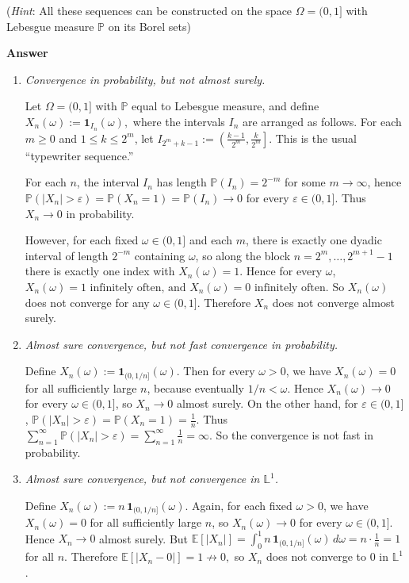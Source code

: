 \documentclass[letterpaper]{article}
\begin{document}
		(\emph{Hint}: All these sequences can be constructed on the space $\Omega=(0,1]$ with Lebesgue measure $\mathbb{P}$ on its Borel sets)
		
		
		\textbf{Answer} 
		
		\begin{enumerate}
			
			\item[(i)] \emph{Convergence in probability, but not almost surely.}
			
			Let $\Omega=(0,1]$ with $\mathbb{P}$ equal to Lebesgue measure, and define
			$
			X_n(\omega):=\mathbf{1}_{I_n}(\omega),
			$
			where the intervals $I_n$ are arranged as follows. For each $m\geq 0$ and $1\leq k\leq 2^m$, let
			$
			I_{2^m+k-1}:=\left(\frac{k-1}{2^m},\frac{k}{2^m}\right].
			$
			This is the usual “typewriter sequence.”
			
			For each $n$, the interval $I_n$ has length
			$
			\mathbb{P}(I_n)=2^{-m}
			$
			for some $m\to\infty$, hence
			$
			\mathbb{P}(|X_n|>\varepsilon)=\mathbb{P}(X_n=1)=\mathbb{P}(I_n)\to 0
			$
			for every $\varepsilon\in(0,1]$. Thus $X_n\to 0$ in probability.
			
			However, for each fixed $\omega\in(0,1]$ and each $m$, there is exactly one dyadic interval of length $2^{-m}$ containing $\omega$, so along the block
			$
			n=2^m,\dots,2^{m+1}-1
			$
			there is exactly one index with $X_n(\omega)=1$. Hence for every $\omega$,
			$
			X_n(\omega)=1 \text{ infinitely often, and } X_n(\omega)=0 \text{ infinitely often}.
			$
			So $X_n(\omega)$ does not converge for any $\omega\in(0,1]$. Therefore $X_n$ does {not} converge almost surely.
			
			\item[(ii)] \emph{Almost sure convergence, but not fast convergence in probability.}
			
			Define
			$
			X_n(\omega):=\mathbf{1}_{(0,1/n]}(\omega).
			$
			Then for every $\omega>0$, we have $X_n(\omega)=0$ for all sufficiently large $n$, because eventually $1/n<\omega$. Hence
			$
			X_n(\omega)\to 0
			$
			for every $\omega\in(0,1]$, so $X_n\to 0$ almost surely. On the other hand, for $\varepsilon\in(0,1]$,
			$
			\mathbb{P}(|X_n|>\varepsilon)=\mathbb{P}(X_n=1)=\frac{1}{n}.
			$
			Thus
			$
			\sum_{n=1}^\infty \mathbb{P}(|X_n|>\varepsilon)
			=
			\sum_{n=1}^\infty \frac{1}{n}
			=
			\infty.
			$
			So the convergence is not fast in probability.
			
			\item[(iii)] \emph{Almost sure convergence, but not convergence in $\mathbb{L}^1$.}
			
			Define
			$
			X_n(\omega):=n\,\mathbf{1}_{(0,1/n]}(\omega).
			$
			Again, for each fixed $\omega>0$, we have $X_n(\omega)=0$ for all sufficiently large $n$, so
			$
			X_n(\omega)\to 0
			$
			for every $\omega\in(0,1]$. Hence $X_n\to 0$ almost surely. But
			$
			\mathbb{E}[|X_n|]
			=
			\int_0^1 n\,\mathbf{1}_{(0,1/n]}(\omega)\,d\omega
			=
			n\cdot \frac{1}{n}
			=
			1
			$
			for all $n$. Therefore
			$
			\mathbb{E}[|X_n-0|]=1 \not\to 0,
			$
			so $X_n$ does not converge to $0$ in $\mathbb{L}^1$.
			
		\end{enumerate}
		
\end{document}
